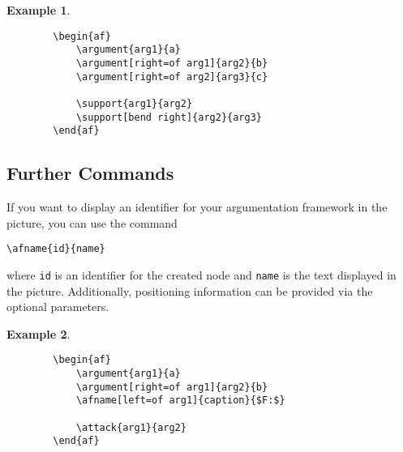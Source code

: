 \documentclass{article}
\newtheorem{example}{Example}
\begin{document}
    \begin{example}~
    \begin{verbatim}
        \begin{af}
            \argument{arg1}{a}
            \argument[right=of arg1]{arg2}{b}
            \argument[right=of arg2]{arg3}{c}
    
            \support{arg1}{arg2}
            \support[bend right]{arg2}{arg3}
        \end{af}    
    \end{verbatim}

    \begin{center}
        \begin{af}
    
        \end{af}    
    \end{center}
    \end{example}


\subsection{Further Commands}
    If you want to display an identifier for your argumentation framework in the picture, you can use the command

    \verb|\afname{id}{name}|

    \noindent
    where \verb|id| is an identifier for the created node and \verb|name| is the text displayed in the picture.
    Additionally, positioning information can be provided via the optional parameters.

    \begin{example}~
    \begin{verbatim}
        \begin{af}
            \argument{arg1}{a}
            \argument[right=of arg1]{arg2}{b}
            \afname[left=of arg1]{caption}{$F:$}
    
            \attack{arg1}{arg2}
        \end{af}    
    \end{verbatim}

    \begin{center}
        \begin{af}
    
        \end{af}    
    \end{center}
    \end{example}
\end{document}
